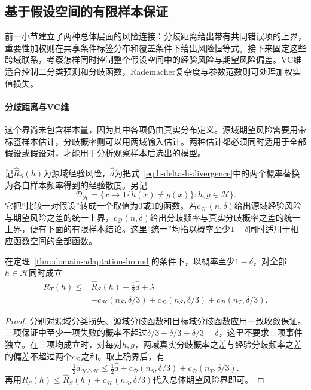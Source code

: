 \subsection{基于假设空间的有限样本保证}
\label{sec:adaptation-classwide-bounds}

前一小节建立了两种总体层面的风险连接：分歧距离给出带有共同错误项的上界，重要性加权则在共享条件标签分布和覆盖条件下给出风险恒等式。接下来固定这些跨域联系，考察怎样同时控制整个假设空间中的经验风险与期望风险偏差。VC维适合控制二分类预测和分歧函数，Rademacher复杂度与参数范数则可处理加权实值损失。

\paragraph{分歧距离与VC维}

这个界尚未包含样本量，因为其中各项仍由真实分布定义。源域期望风险需要用带标签样本估计，分歧概率则可以用两域输入估计。两种估计都必须同时适用于全部假设或假设对，才能用于分析观察样本后选出的模型。

记$\hat R_S(h)$为源域经验风险，$\widehat d$为把式~\eqref{eq:h-delta-h-divergence}中的两个概率替换为各自样本频率得到的经验散度。另记
\[
 \mathcal D_{\mathcal H}
 =\{x\mapsto\mathbf1\{h(x)\neq g(x)\}:h,g\in\mathcal H\}.
\]
它把“比较一对假设”转成一个取值为0或1的函数。若$c_{\mathcal H}(n,\delta)$给出源域经验风险与期望风险之差的统一上界，$c_{\mathcal D}(n,\delta)$给出分歧频率与真实分歧概率之差的统一上界，便有下面的有限样本结论。这里“统一”均指以概率至少$1-\delta$同时适用于相应函数空间的全部函数。

\begin{theorem}[有限样本的领域自适应期望风险界]
\label{thm:adaptation-finite-sample}
在定理~\ref{thm:domain-adaptation-bound}的条件下，以概率至少$1-\delta$，对全部$h\in\mathcal H$同时成立
\begin{equation}
 \begin{aligned}
 R_T(h)\leq{}&\hat R_S(h)+\tfrac12\widehat d+\lambda\\
 &+c_{\mathcal H}(n_S,\delta/3)
  +c_{\mathcal D}(n_S,\delta/3)
  +c_{\mathcal D}(n_T,\delta/3).
 \end{aligned}
 \label{eq:adaptation-vc-risk}
\end{equation}
\end{theorem}
\begin{proof}
分别对源域分类损失、源域分歧函数和目标域分歧函数应用一致收敛保证。三项保证中至少一项失败的概率不超过$\delta/3+\delta/3+\delta/3=\delta$，这里不要求三项事件独立。在三项均成立时，对每对$h,g$，两域真实分歧概率之差与经验分歧频率之差的偏差不超过两个$c_{\mathcal D}$之和。取上确界后，有
\[
 \tfrac12d_{\mathcal H\triangle\mathcal H}
 \leq\tfrac12\widehat d
 +c_{\mathcal D}(n_S,\delta/3)+c_{\mathcal D}(n_T,\delta/3).
\]
再用$R_S(h)\leq\hat R_S(h)+c_{\mathcal H}(n_S,\delta/3)$代入总体期望风险界即可。
\end{proof}

